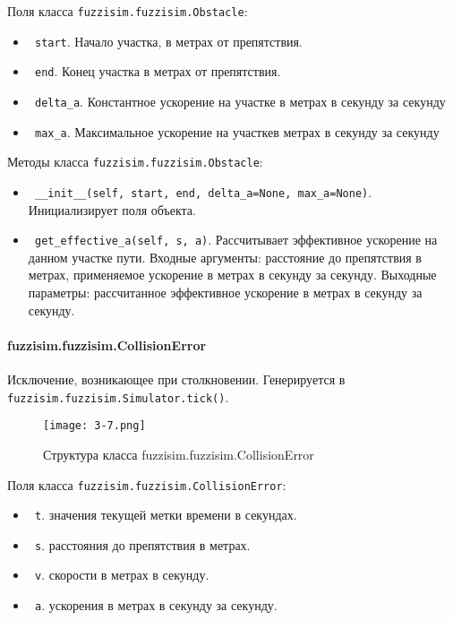 Поля класса \lstinline!fuzzisim.fuzzisim.Obstacle!:
\begin{itemize}
	\item \lstinline! start!. Начало участка, в метрах от препятствия.
	\item \lstinline! end!. Конец участка в метрах от препятствия.
	\item \lstinline! delta_a!. Константное ускорение на участке в метрах в секунду за секунду
	\item \lstinline! max_a!.  Максимальное ускорение на участкев метрах в секунду за секунду
\end{itemize}

Методы класса \lstinline!fuzzisim.fuzzisim.Obstacle!:
\begin{itemize}
	\item \lstinline! __init__(self, start, end, delta_a=None, max_a=None)!. Инициализирует поля объекта.
	\item \lstinline! get_effective_a(self, s, a)!.  Рассчитывает эффективное ускорение на данном участке пути. Входные аргументы: расстояние до препятствия в метрах, применяемое ускорение в метрах в секунду за секунду. Выходные параметры: рассчитанное эффективное ускорение в метрах в секунду за секунду.
\end{itemize}





\paragraph{fuzzisim.fuzzisim.CollisionError}
Исключение, возникающее при столкновении. Генерируется в \lstinline!fuzzisim.fuzzisim.Simulator.tick()!.


\begin{figure}[ht]
	\centering
	\texttt{[image: 3-7.png]}
	\caption{ Структура класса fuzzisim.fuzzisim.CollisionError}
\end{figure}

Поля класса \lstinline!fuzzisim.fuzzisim.CollisionError!:
\begin{itemize}
	\item \lstinline! t!. значения текущей метки времени в секундах.
	\item \lstinline! s!. расстояния до препятствия в метрах.
	\item \lstinline! v!. скорости в метрах в секунду.
	\item \lstinline! a!. ускорения в метрах в секунду за секунду.
\end{itemize}



